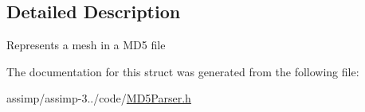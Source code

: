 \subsection{Detailed Description}
Represents a mesh in a M\+D5 file 

The documentation for this struct was generated from the following file\+:\begin{DoxyCompactItemize}
\item 
assimp/assimp-\/3../code/\hyperlink{_m_d5_parser_8h}{M\+D5\+Parser.\+h}\end{DoxyCompactItemize}
